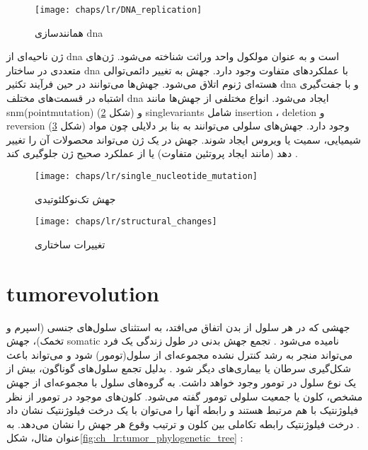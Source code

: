 \begin{figure}[!ht]
	\centerline{\texttt{[image: chaps/lr/DNA\_replication]}}
	\caption{همانندسازی \gls{dna}}
	\label{fig:ch_lr:DNA_replication}
\end{figure}





ژن ناحیه‌ای از \gls{dna} است و به عنوان مولکول واحد وراثت شناخته می‌شود. ژن‌های متعددی در ساختار \gls{dna} با عملکرد‌های متفاوت وجود دارد. جهش به تغییر دائمی‌توالی هسته‌ای ژنوم اتلاق می‌شود. جهش‌ها می‌توانند در حین فرآیند تکثیر \gls{dna} و با جفت‌گیری اشتباه در قسمت‌های مختلف \gls{dna} ایجاد می‌شود. انواع مختلفی از جهش‌ها مانند \gls{snm}(\gls{pointmutation})  (شکل \ref{fig:ch_lr:single_nucleotide_mutation}) و  \glspl{singlevariant}  شامل \gls{insertion} ، \gls{deletion}  و \gls{reversion}  (شکل \ref{fig:ch_lr:structural_changes}) وجود دارد. جهش‌های سلولی می‌توانند به بنا بر دلایلی چون مواد شیمیایی، سمیت یا ویروس ایجاد شوند. جهش در یک ژن می‌تواند محصولات آن را تغییر دهد (مانند ایجاد پروتئین متفاوت) یا از عملکرد صحیح ژن جلوگیری کند \cite{alberts2002molecular}.




\begin{figure}[!ht]
	\centerline{\texttt{[image: chaps/lr/single\_nucleotide\_mutation]}}
	\caption{جهش تک‌نوکلئوتیدی}
	\label{fig:ch_lr:single_nucleotide_mutation}
\end{figure}



\begin{figure}[!ht]
	\centerline{\texttt{[image: chaps/lr/structural\_changes]}}
	\caption{تغییرات ساختاری}
	\label{fig:ch_lr:structural_changes}
\end{figure}




\section{\gls{tumorevolution}}


جهشی که در هر سلول از بدن اتفاق می‌افتد، به استثنای سلول‌های جنسی (اسپرم و تخمک)، جهش \gls{somatic}  نامیده می‌شود \cite{somaticMutation}. تجمع جهش بدنی در طول زندگی یک فرد می‌تواند منجر به رشد کنترل نشده مجموعه‌ای از سلول(تومور) شود \cite{nowell1976clonal} و می‌تواند باعث شکل‌گیری سرطان یا بیماری‌های دیگر شود \cite{somaticMutation}. بدلیل تجمع سلول‌های گوناگون، بیش از یک نوع سلول در تومور وجود خواهد داشت. به گروه‌های سلول با مجموعه‌ای از جهش مشخص، کلون یا جمعیت سلولی تومور گفته می‌شود. کلون‌های موجود در تومور از نظر فیلوژنتیک با هم مرتبط هستند و رابطه آنها را می‌توان با یک درخت فیلوژنتیک نشان داد \cite{birbrair2014type}. درخت فیلوژنتیک رابطه تکاملی بین کلون و ترتیب وقوع هر جهش را نشان می‌دهد. به عنوان مثال، شکل\ref{fig:ch_lr:tumor_phylogenetic_tree} :

